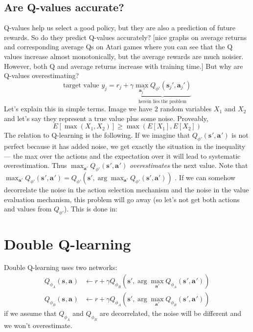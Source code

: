 \documentclass{report}
\newcommand{\argmax}{\arg\!\max}
\begin{document}
\subsection{Are Q-values accurate?}
Q-values help us select a good policy, but they are also a prediction of future rewards.
So do they predict Q-values accurately?
[nice graphs on average returns and corresponding average Qs on Atari games where you can see that the Q values increase almost monotonically,
but the average rewards are much noisier. However, both Q and average returns increase with training time.]
But why are Q-values overestimating?
\begin{equation}
		\text{target value } y_j = r_j + \gamma \underbrace{ \max_{\bm{a}_j'} Q_{\phi'}(\bm{s}_{j}', \bm{a}_{j}')}_{\text{herein lies the problem}}
\end{equation}
Let's explain this in simple terms.
Image we have 2 random variables $X_1$ and $X_2$ and let's say they represent a true value plus some noise.
Proveably,
\begin{equation}
		E \left[ \max (X_1, X_2) \right] \geq \max	\left( E[X_1], E[X_2] \right) 
\end{equation}
The relation to Q-learning is the following.
If we imagine that $Q_{\phi'}(\bm{s}_{}', \bm{a}_{}')$ is not perfect because it has added noise,
we get exactly the situation in the inequality --- the max over the actions and the expectation
over it will lead to systematic overestimation.
Thus $\max_{\bm{a}'} Q_{\phi'}(\bm{s}_{}', \bm{a}_{}')$ \textit{overestimates} the next value.
Note that $\max_{\bm{a}'} Q_{\phi'}(\bm{s}_{}', \bm{a}_{}') = Q_{\phi'} (\bm{s}', \argmax_{\bm{a}'}Q_{\phi'}(\bm{s}', \bm{a}'))$ .
If we can somehow decorrelate the noise in the action selection mechanism and the noise in the value evaluation
mechanism, this problem will go away (so let's not get both actions and values from $Q_{\phi'}$).
This is done in:

\section{Double Q-learning}
Double Q-learning uses two networks:
\begin{align}
		Q_{\phi_A}(\bm{s}_{}, \bm{a}_{}) &\leftarrow r + \gamma Q_{\phi_B} \left( \bm{s}', \argmax_{\bm{a}'}Q_{\phi_A}(\bm{s}_{}', \bm{a}_{}') \right) \\
		Q_{\phi_B}(\bm{s}_{}, \bm{a}_{}) &\leftarrow r + \gamma Q_{\phi_A} \left( \bm{s}', \argmax_{\bm{a}'}Q_{\phi_B}(\bm{s}_{}', \bm{a}_{}') \right) 
\end{align}
if we assume that $Q_{\phi_A}$ and $Q_{\phi_B}$ are decorrelated, the noise will be different and we won't overestimate.
\end{document}

